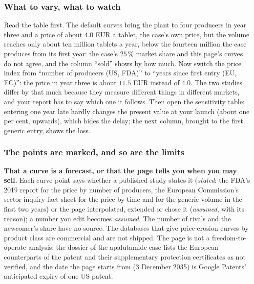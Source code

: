 \documentclass[11pt,a4paper]{article}
\begin{document}
\subsubsection*{What to vary, what to watch}

\begin{tryit}
Read the table first.  The default curves bring the plant to four
producers in year three and a price of about $4.0$ EUR a tablet, the case's
own price, but the volume reaches only about ten million tablets a year,
below the fourteen million the case produces from its first year: the
case's $25\,\%$ market share and this page's curves do not agree, and the
column ``sold'' shows by how much.  Now switch the price index from
``number of producers (US, FDA)'' to ``years since first entry (EU, EC)'':
the price in year three is about $11.5$ EUR instead of $4.0$.  The two
studies differ by that much because they measure different things in
different markets, and your report has to say which one it follows.  Then
open the sensitivity table: entering one year late hardly changes the present
value at your launch (about one per cent, upwards), which hides the delay; the next
column, brought to the first generic entry, shows the loss.
\end{tryit}

\subsubsection*{The points are marked, and so are the limits}

\begin{pitfall}
\textbf{That a curve is a forecast, or that the page tells you when you may
sell.}  Each curve point says whether a published study states it
(\emph{stated}: the FDA's 2019 report for the price by number of producers,
the European Commission's sector inquiry fact sheet for the price by time
and for the generic volume in the first two years) or the page interpolated,
extended or chose it (\emph{assumed}, with its reason); a number you edit
becomes \emph{assumed}.  The number of rivals and the newcomer's share have
no source.  The databases that give price-erosion curves by product class
are commercial and are not shipped.  The page is not a freedom-to-operate
analysis: the dossier of the apalutamide case lists the European
counterparts of the patent and their supplementary protection certificates
as not verified, and the date the page starts from (3 December 2035) is
Google Patents' anticipated expiry of one US patent.
\end{pitfall}
\end{document}
